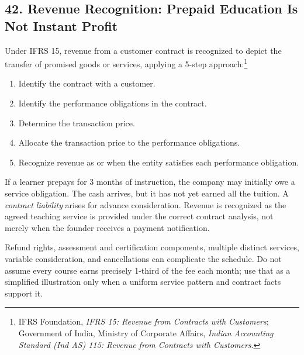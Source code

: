 \subsection*{42. Revenue Recognition: Prepaid Education Is Not Instant Profit}

Under IFRS 15, revenue from a customer contract is recognized to depict the transfer of promised goods or services, applying a 5-step approach:\footnote{IFRS Foundation, \emph{IFRS 15: Revenue from Contracts with Customers}; Government of India, Ministry of Corporate Affairs, \emph{Indian Accounting Standard (Ind AS) 115: Revenue from Contracts with Customers}.}
\begin{enumerate}
  \item Identify the contract with a customer.
  \item Identify the performance obligations in the contract.
  \item Determine the transaction price.
  \item Allocate the transaction price to the performance obligations.
  \item Recognize revenue as or when the entity satisfies each performance obligation.
\end{enumerate}

If a learner prepays for 3 months of instruction, the company may initially owe a service obligation. The cash arrives, but it has not yet earned all the tuition. A \emph{contract liability} arises for advance consideration. Revenue is recognized as the agreed teaching service is provided under the correct contract analysis, not merely when the founder receives a payment notification.

Refund rights, assessment and certification components, multiple distinct services, variable consideration, and cancellations can complicate the schedule. Do not assume every course earns precisely 1-third of the fee each month; use that as a simplified illustration only when a uniform service pattern and contract facts support it.
